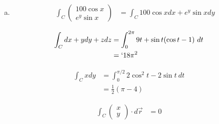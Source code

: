 \documentclass[8pt]{extarticle}
\begin{document}
\begin{problem}{18.2}
\begin{description}[font=\normalfont]
\begin{enumerate}[(a)]
          \item
            \begin{align*}
              \int_{C} \begin{pmatrix}100\cos x\\ e^y\sin x\end{pmatrix} &= \int_{C} 100\cos x dx + e^y\sin x dy
            \end{align*}
        \end{enumerate}
      \item[30:]
        \begin{align*}
          \int_{C} dx + ydy + zdz &= \int_{0}^{2\pi}9t + \sin t(\cos t - 1)~dt\\
                                  &= `18\pi^2
        \end{align*}
      \item[34:]
        \begin{align*}
          \int_{C} x dy &= \int_{0}^{\pi/2} 2\cos^2 t - 2\sin t~dt\\
                        &= \frac{1}{2}(\pi-4)
        \end{align*}
      \item[38:]
        \begin{align*}
          \int_{C} \begin{pmatrix}x\\y\end{pmatrix}\cdot d\vec{r} &= 0
        \end{align*}
    \end{description}
  \end{problem}
\end{document}
